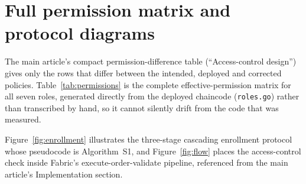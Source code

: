 \clearpage
\section{Full permission matrix and protocol diagrams}
\label{sec:supp_permissions}

The main article's compact permission-difference table (``Access-control
design'') gives only the rows that differ between the intended, deployed
and corrected policies. Table~\ref{tab:permissions} is the complete
effective-permission matrix for all seven roles, generated directly from
the deployed chaincode (\texttt{roles.go}) rather than transcribed by
hand, so it cannot silently drift from the code that was measured.



Figure~\ref{fig:enrollment} illustrates the three-stage cascading
enrollment protocol whose pseudocode is Algorithm~S1, and
Figure~\ref{fig:flow} places the access-control check inside Fabric's
execute-order-validate pipeline, referenced from the main article's
Implementation section.

